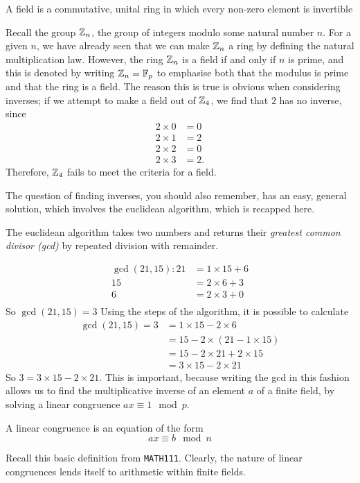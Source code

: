 \begin{definition}
	A field is a commutative, unital ring in which every non-zero element is invertible
\end{definition}
Recall the group $\zn$, the group of integers modulo some natural number $n$.
For a given $n$, we have already seen that we can make $\zn$ a ring by defining the natural multiplication law.
However, the ring $\zn$ is a field if and only if $n$ is prime, and this is denoted by writing $\zn = \fp$ to emphasise both that the modulus is prime and that the ring is a field.
The reason this is true is obvious when considering inverses; if we attempt to make a field out of $\zn[4]$, we find that $2$ has no inverse, since
\begin{align*}
	2 \times 0 &= 0\\
	2 \times 1 &= 2\\
	2 \times 2 &= 0\\
	2 \times 3 &= 2.
\end{align*}
Therefore, $\zn[4]$ fails to meet the criteria for a field.

The question of finding inverses, you should also remember, has an easy, general solution, which involves the euclidean algorithm, which is recapped here.
\begin{definition}
	The euclidean algorithm takes two numbers and returns their \emph{greatest common divisor (gcd)} by repeated division with remainder.
\end{definition}
\begin{align*}
	\gcd(21,15):21 &= 1\times15 + 6\\
	15 &= 2\times6 + 3\\
	6 &= 2\times3 + 0\\
\end{align*}
So $\gcd(21,15)=3$
Using the steps of the algorithm, it is possible to calculate
\begin{align*}
	\gcd(21,15) = 3 &= 1\times15 - 2\times6\\
	&= 15 - 2\times(21 - 1\times15)\\
	&= 15 - 2\times21 + 2\times15\\
	&=3\times15 - 2\times21
\end{align*}
So $3 = 3\times15 - 2\times21$. This is important, because writing the gcd in this fashion allows us to find the multiplicative inverse of an element $a$ of a finite field, by solving a linear congruence $ax\equiv 1 \mod p$.
\begin{definition}
	A linear congruence is an equation of the form
	$$ax \equiv b \mod n$$
\end{definition}
Recall this basic definition from \texttt{MATH111}. Clearly, the nature of linear congruences lends itself to arithmetic within finite fields.
